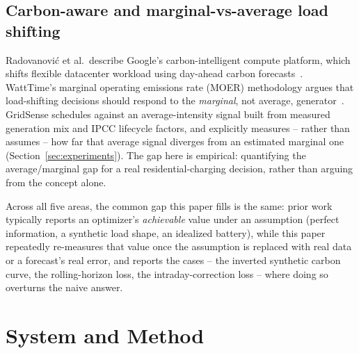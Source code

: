 \documentclass[journal]{IEEEtran}
\begin{document}
\subsection{Carbon-aware and marginal-vs-average load shifting}
Radovanovi{\'c} et al.\ describe Google's carbon-intelligent compute platform, which shifts flexible datacenter workload using day-ahead carbon forecasts~\cite{radovanovic2021}. WattTime's marginal operating emissions rate (MOER) methodology argues that load-shifting decisions should respond to the \emph{marginal}, not average, generator~\cite{watttime_moer}. GridSense schedules against an average-intensity signal built from measured generation mix and IPCC lifecycle factors, and explicitly measures -- rather than assumes -- how far that average signal diverges from an estimated marginal one (Section~\ref{sec:experiments}). The gap here is empirical: quantifying the average/marginal gap for a real residential-charging decision, rather than arguing from the concept alone.

\medskip
Across all five areas, the common gap this paper fills is the same: prior work typically reports an optimizer's \emph{achievable} value under an assumption (perfect information, a synthetic load shape, an idealized battery), while this paper repeatedly re-measures that value once the assumption is replaced with real data or a forecast's real error, and reports the cases -- the inverted synthetic carbon curve, the rolling-horizon loss, the intraday-correction loss -- where doing so overturns the naive answer.

\section{System and Method}
\label{sec:method}
\end{document}
